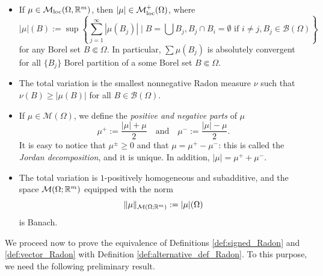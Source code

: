 \begin{remarks} \hfill
\begin{itemize}
\item If $\mu \in \mathcal{M}_{\rm loc}(\Omega,\mathbb{R}^m)$, then $|\mu| \in
\mathcal{M}^+_{\rm loc}(\Omega)$, where
\[
|\mu|(B) := \sup \left \{\sum_{j=1} ^\infty |\mu(B_j)| \mid 
B= \bigcup B_j, B_j \cap B_i = \emptyset \text{ if } i\neq j, B_j \in \mathcal{B}(\Omega)
\right \}
\]
for any Borel set $B \Subset \Omega$.
In particular, $\sum \mu(B_j)$ is absolutely convergent for all $\{B_j\}$
Borel partition of a some Borel set $B \Subset \Omega$.
\item The total variation is the smallest nonnegative Radon measure $\nu$ such
that $\nu (B) \geq |\mu(B)|$ for all $B \in \mathcal{B}(\Omega)$.
\item If $\mu \in \mathcal{M}(\Omega)$, we define the {\em positive and negative
parts} of $\mu$ 
\[
\mu^+ := \frac{|\mu| + \mu}{2} \quad \text{and} \quad
\mu^- := \frac{|\mu| - \mu}{2}.
\]
It is easy to notice that $\mu^{\pm} \geq 0$ and that $\mu = \mu^{+} - \mu^{-}$: this is called the {\em Jordan decomposition}, and it is unique. In addition, $|\mu| = \mu^{+} + \mu^{-}$.
\item The total variation is $1$-positively homogeneous and subadditive, and the space $\mathcal{M}(\Omega; \mathbb{R}^{m})$ equipped with the norm
\begin{equation*}
\|\mu\|_{\mathcal{M}(\Omega; \mathbb{R}^{m})} := |\mu|(\Omega)
\end{equation*}
is Banach.
\end{itemize}
\end{remarks}

We proceed now to prove the equivalence of Definitions \ref{def:signed_Radon} and \ref{def:vector_Radon} with Definition \ref{def:alternative_def_Radon}. To this purpose, we need the following preliminary result.

